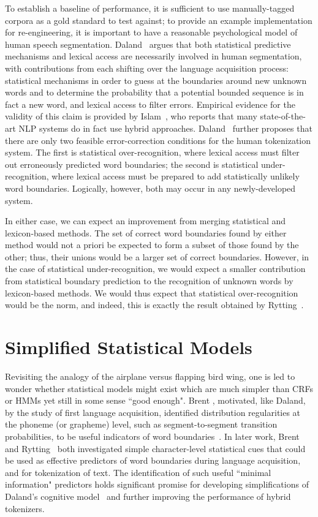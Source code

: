 To establish a baseline of performance, it is sufficient to use manually-tagged corpora as a gold standard to test against; to provide an example implementation for re-engineering, it is important to have a reasonable psychological model of human speech segmentation. Daland~\cite{daland09} argues that both statistical predictive mechanisms and lexical access are necessarily involved in human segmentation, with contributions from each shifting over the language acquisition process: statistical mechanisms in order to guess at the boundaries around new unknown words and to determine the probability that a potential bounded sequence is in fact a new word, and lexical access to filter errors. Empirical evidence for the validity of this claim is provided by Islam~\cite{islam07}, who reports that many state-of-the-art NLP systems do in fact use hybrid approaches. Daland~\cite{daland09} further proposes that there are only two feasible error-correction conditions for the human tokenization system. The first is statistical over-recognition, where lexical access must filter out erroneously predicted word boundaries; the second is statistical under-recognition, where lexical access must be prepared to add statistically unlikely word boundaries. Logically, however, both may occur in any newly-developed system.

In either case, we can expect an improvement from merging statistical and lexicon-based methods. The set of correct word boundaries found by either method would not a priori be expected to form a subset of those found by the other; thus, their unions would be a larger set of correct boundaries. However, in the case of statistical under-recognition, we would expect a smaller contribution from statistical boundary prediction to the recognition of unknown words by lexicon-based methods. We would thus expect that statistical over-recognition would be the norm, and indeed, this is exactly the result obtained by Rytting~\cite{rytting04}.

\section{Simplified Statistical Models}

Revisiting the analogy of the airplane versus flapping bird wing, one is led to wonder whether statistical models might exist which are much simpler than CRFs or HMMs yet still in some sense ``good enough".  Brent \cite{brent99}, motivated, like Daland, by the study of first language acquisition, identified distribution regularities at the phoneme (or grapheme) level, such as segment-to-segment transition probabilities, to be useful indicators of word boundaries~\cite{brent96}. In later work, Brent~\cite{brent99} and Rytting~\cite{rytting04} both investigated simple character-level statistical cues that could be used as effective predictors of word boundaries during language acquisition, and for tokenization of text. The identification of such useful ``minimal information" predictors holds significant promise for developing simplifications of Daland's cognitive model~\cite{daland09} and further improving the performance of hybrid tokenizers.

